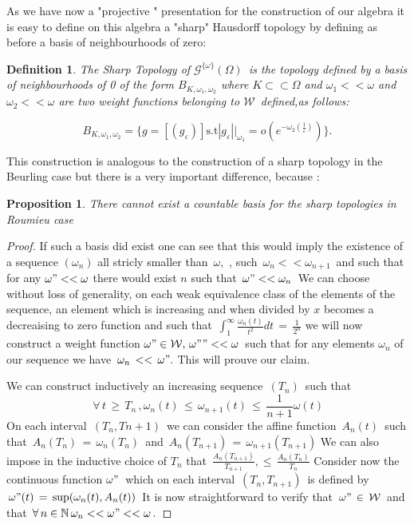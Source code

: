 \documentclass[12pt,a4paper]{amsart}
\newcommand{\NN}{\mathbb N}
\newtheorem{proposition}[theorem]{Proposition}
\newtheorem{definition}[theorem]{Definition}
\begin{document}
As we have now a "projective " presentation for the construction of our algebra it is easy to define on this algebra a "sharp" Hausdorff topology by defining as before a basis of neighbourhoods of zero: 

\begin{definition}
The Sharp Topology of $\mathcal{G}^{\{\omega\}}(\Omega)\,$
is the topology defined by a basis of neighbourhoods of 0 of the form 
$B_{K,\omega_1,\omega_2}$
where $K\subset\subset \Omega$ and $\omega_1<<\omega $ and 
$\omega_2<<\omega$ are two weight functions belonging to 
$\mathcal{W} \,$ defined,as follows:

$$  B_{K ,\omega_1,\omega_2} = \{g = [(g_{\varepsilon})] \mbox{s.t}  |g_{\varepsilon}||_ {\omega_1} =
 o(e^{-\omega_2(\frac{1}{\varepsilon})})  \}         .  $$ 
\end{definition}
 

  This construction is analogous to the construction of a sharp topology in the Beurling case but there is a very important difference, because :
   
   \begin{proposition}
 There cannot exist a countable basis for the sharp topologies in Roumieu case 
 \end{proposition}
 
 \begin{proof}
 If such a basis did exist one can see that this would  imply  the existence of a sequence $(\omega_n)$  all stricly smaller than $\,\omega,$ , such  
 $\,\omega_n<<\omega_{n+1} \,$ and such that
 for any $\omega"<<\omega$ there would exist $n$ such that 
 $\,\omega"<<\omega_n\,$
  We can choose without loss of generality, on each weak equivalence class of the elements of the sequence, an element which is increasing and when divided by $x$ becomes a decreaising to zero function and such that 
  $\,\int_1^\infty \frac{\omega_n(t)}{t^2}dt\,
  = \,\frac{1}{2^n}$
  we will now construct a weight function
   $\omega" \in \mathcal{W},\, \omega""<<\omega\,$ 
  such that for any elements $\omega_n$ of our sequence we have
  $\,\omega_n \,<<\,\omega".$
  This will prouve our claim.
  
  We can construct inductively an increasing sequence 
  $\,(T_n)\,$ such that 
  $$\,\forall\,t\,\geq\,T_n\,,\omega_n(t)\,
  \leq\,\omega_{n+1}(t)\,\leq\,\frac{1}{n+1}\omega(t)$$
  On each interval $\,(T_n,T{n+1})\,$ we can consider the affine function $\,A_n(t)\,$ such that
   $\,A_n(T_n)\,=\,\omega_n(T_n)\,$ 
   and $\,A_n(T_{n+1})\,=\,\omega_{n+1}(T_{n+1})$
   We can also impose in the inductive choice of $T_n$ that 
   $\,\frac{A_n(T_{n+1})}{T_{n+1}},\leq\,
   \frac{A_n(T_n)}{T_n} $
   Consider now the continuous function $\omega"\,$
   which on each interval $\,(T_n,T_{n+1})\,$ is defined by $\,\omega"(t)\,=\,\sup (\omega_n(t),A_n(t))\,$
   It is now straightforward to verify that
   $\,\omega"\,\in\,\mathcal{W}\,$ and that 
   $\,\forall\,n\in\NN\,\omega_n<<\omega"<<\omega\,.$ 
   \end{proof}
\end{document}
